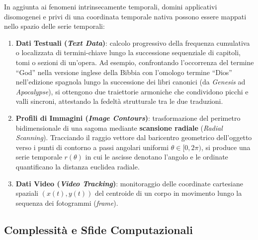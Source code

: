 In aggiunta ai fenomeni intrinsecamente temporali, domini applicativi disomogenei e privi di una coordinata temporale nativa possono essere mappati nello spazio delle serie temporali:
\begin{enumerate}
    \item \textbf{Dati Testuali (\textit{Text Data})}: calcolo progressivo della frequenza cumulativa o localizzata di termini-chiave lungo la successione sequenziale di capitoli, tomi o sezioni di un'opera. Ad esempio, confrontando l'occorrenza del termine ``God'' nella versione inglese della Bibbia con l'omologo termine ``Dios'' nell'edizione spagnola lungo la successione dei libri canonici (da \textit{Genesis} ad \textit{Apocalypse}), si ottengono due traiettorie armoniche che condividono picchi e valli sincroni, attestando la fedelt\`a strutturale tra le due traduzioni.
    \item \textbf{Profili di Immagini (\textit{Image Contours})}: trasformazione del perimetro bidimensionale di una sagoma mediante \textbf{scansione radiale} (\textit{Radial Scanning}). Tracciando il raggio vettore dal baricentro geometrico dell'oggetto verso i punti di contorno a passi angolari uniformi $\theta \in [0, 2\pi)$, si produce una serie temporale $r(\theta)$ in cui le ascisse denotano l'angolo e le ordinate quantificano la distanza euclidea radiale.
    \item \textbf{Dati Video (\textit{Video Tracking})}: monitoraggio delle coordinate cartesiane spaziali $(x(t), y(t))$ del centroide di un corpo in movimento lungo la sequenza dei fotogrammi (\textit{frame}).
\end{enumerate}

\FloatBarrier
\subsection{Complessit\`a e Sfide Computazionali}
\label{subsec:ts-computational-challenges}

